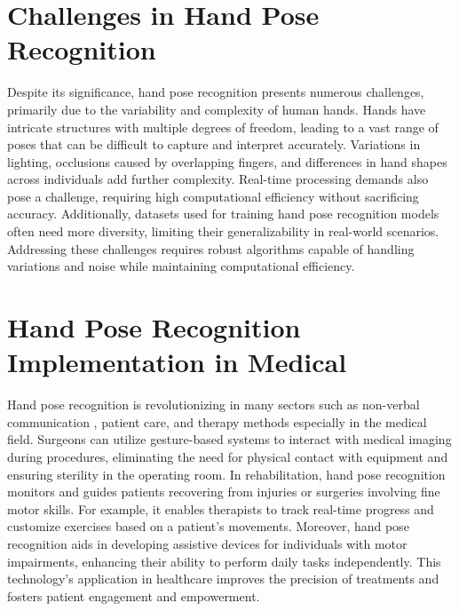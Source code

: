 \section{Challenges in Hand Pose Recognition}

Despite its significance, hand pose recognition presents numerous challenges, primarily due to the variability and complexity of human hands. Hands have intricate structures with multiple degrees of freedom, leading to a vast range of poses that can be difficult to capture and interpret accurately. Variations in lighting, occlusions caused by overlapping fingers, and differences in hand shapes across individuals add further complexity. Real-time processing demands also pose a challenge, requiring high computational efficiency without sacrificing accuracy. Additionally, datasets used for training hand pose recognition models often need more diversity, limiting their generalizability in real-world scenarios. Addressing these challenges requires robust algorithms capable of handling variations and noise while maintaining computational efficiency.

\section{Hand Pose Recognition Implementation in Medical}
Hand pose recognition is revolutionizing in many sectors such as non-verbal communication \cite{ZHANG20242399}, patient care, and therapy methods especially in the medical field. Surgeons can utilize gesture-based systems to interact with medical imaging during procedures, eliminating the need for physical contact with equipment and ensuring sterility in the operating room. In rehabilitation, hand pose recognition monitors and guides patients recovering from injuries or surgeries involving fine motor skills. For example, it enables therapists to track real-time progress and customize exercises based on a patient's movements. Moreover, hand pose recognition aids in developing assistive devices for individuals with motor impairments, enhancing their ability to perform daily tasks independently. This technology's application in healthcare improves the precision of treatments and fosters patient engagement and empowerment.